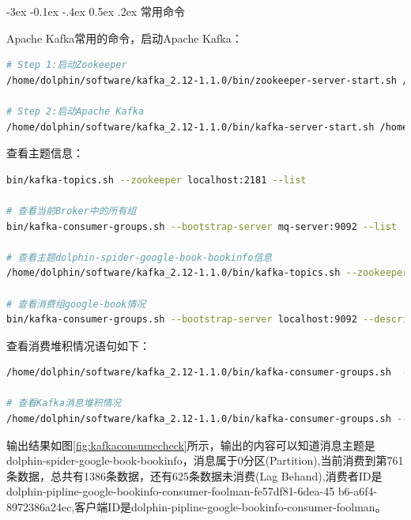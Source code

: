 \documentclass[8pt]{book}
\makeatletter
\numberwithin{dummy}{section}
\theoremstyle{ocrenumbox}
\theoremstyle{blacknumex}
\theoremstyle{blacknumbox}
\theoremstyle{ocrenum}
\renewcommand{\subsection}{\@startsection {subsection}{2}{\z@}
	{-3ex \@plus -0.1ex \@minus -.4ex}
	{0.5ex \@plus.2ex }
	{\normalfont\sffamily\bfseries}}
\makeatother
\begin{document}
\subsection{常用命令}

Apache Kafka常用的命令，启动Apache Kafka：

\begin{lstlisting}[language=Bash]
# Step 1:启动Zookeeper
/home/dolphin/software/kafka_2.12-1.1.0/bin/zookeeper-server-start.sh /home/dolphin/software/kafka_2.12-1.1.0/config/zookeeper.properties

# Step 2:启动Apache Kafka
/home/dolphin/software/kafka_2.12-1.1.0/bin/kafka-server-start.sh /home/dolphin/software/kafka_2.12-1.1.0/config/server.properties
\end{lstlisting}

查看主题信息：

\begin{lstlisting}[language=Bash]
bin/kafka-topics.sh --zookeeper localhost:2181 --list

# 查看当前Broker中的所有组
bin/kafka-consumer-groups.sh --bootstrap-server mq-server:9092 --list

# 查看主题dolphin-spider-google-book-bookinfo信息
/home/dolphin/software/kafka_2.12-1.1.0/bin/kafka-topics.sh --zookeeper localhost:2181 --describe --topic dolphin-spider-google-book-bookinfo

# 查看消费组google-book情况
bin/kafka-consumer-groups.sh --bootstrap-server localhost:9092 --describe --group google-book
\end{lstlisting}

查看消费堆积情况语句如下：

\begin{lstlisting}[language=Bash]
/home/dolphin/software/kafka_2.12-1.1.0/bin/kafka-consumer-groups.sh  --list --bootstrap-server mq-server:9092

# 查看Kafka消息堆积情况
/home/dolphin/software/kafka_2.12-1.1.0/bin/kafka-consumer-groups.sh --bootstrap-server mq-server:9092 --group google-book --describe
\end{lstlisting}

输出结果如图\ref{fig:kafkaconsumecheck}所示，输出的内容可以知道消息主题是dolphin-spider-google-book-bookinfo，消息属于0分区(Partition),当前消费到第761条数据，总共有1386条数据，还有625条数据未消费(Lag Behand),消费者ID是dolphin-pipline-google-bookinfo-consumer-foolman-fe57df81-6dea-45                                                                    b6-a6f4-8972386a24ec,客户端ID是dolphin-pipline-google-bookinfo-consumer-foolman。
\end{document}
